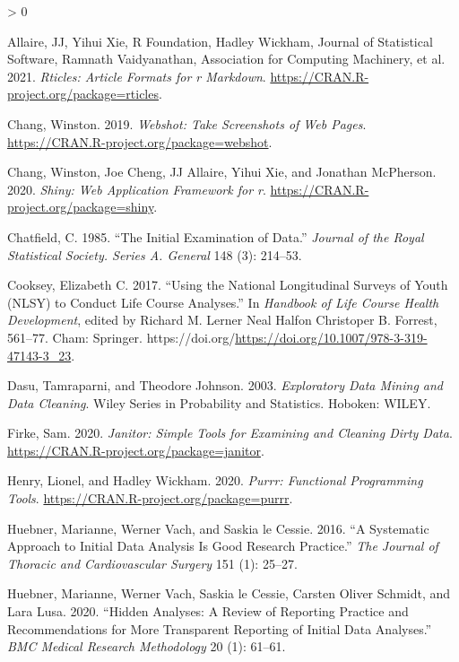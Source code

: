 \documentclass{article}
\newlength{\cslhangindent}
\newenvironment{CSLReferences}[2] %
 {%
  \setlength{\parindent}{0pt}
  \ifodd #1 \everypar{\setlength{\hangindent}{\cslhangindent}}\ignorespaces\fi
  \ifnum #2 > 0
  \setlength{\parskip}{#2\baselineskip}
  \fi
 }%
 {}
\begin{document}
\hypertarget{refs}{}
\begin{CSLReferences}{1}{0}
\leavevmode\hypertarget{ref-rticles}{}%
Allaire, JJ, Yihui Xie, R Foundation, Hadley Wickham, Journal of Statistical Software, Ramnath Vaidyanathan, Association for Computing Machinery, et al. 2021. \emph{Rticles: Article Formats for r Markdown}. \url{https://CRAN.R-project.org/package=rticles}.

\leavevmode\hypertarget{ref-webshot}{}%
Chang, Winston. 2019. \emph{Webshot: Take Screenshots of Web Pages}. \url{https://CRAN.R-project.org/package=webshot}.

\leavevmode\hypertarget{ref-shiny}{}%
Chang, Winston, Joe Cheng, JJ Allaire, Yihui Xie, and Jonathan McPherson. 2020. \emph{Shiny: Web Application Framework for r}. \url{https://CRAN.R-project.org/package=shiny}.

\leavevmode\hypertarget{ref-Chatfield1985TIEo}{}%
Chatfield, C. 1985. {``The Initial Examination of Data.''} \emph{Journal of the Royal Statistical Society. Series A. General} 148 (3): 214--53.

\leavevmode\hypertarget{ref-eliznlsy}{}%
Cooksey, Elizabeth C. 2017. {``Using the National Longitudinal Surveys of Youth (NLSY) to Conduct Life Course Analyses.''} In \emph{Handbook of Life Course Health Development}, edited by Richard M. Lerner Neal Halfon Christoper B. Forrest, 561--77. Cham: Springer. https://doi.org/\url{https://doi.org/10.1007/978-3-319-47143-3_23}.

\leavevmode\hypertarget{ref-DasuTamraparni2003Edma}{}%
Dasu, Tamraparni, and Theodore Johnson. 2003. \emph{Exploratory Data Mining and Data Cleaning}. Wiley Series in Probability and Statistics. Hoboken: WILEY.

\leavevmode\hypertarget{ref-janitor}{}%
Firke, Sam. 2020. \emph{Janitor: Simple Tools for Examining and Cleaning Dirty Data}. \url{https://CRAN.R-project.org/package=janitor}.

\leavevmode\hypertarget{ref-purrr}{}%
Henry, Lionel, and Hadley Wickham. 2020. \emph{Purrr: Functional Programming Tools}. \url{https://CRAN.R-project.org/package=purrr}.

\leavevmode\hypertarget{ref-HuebnerMariannePhD2016Asat}{}%
Huebner, Marianne, Werner Vach, and Saskia le Cessie. 2016. {``A Systematic Approach to Initial Data Analysis Is Good Research Practice.''} \emph{The Journal of Thoracic and Cardiovascular Surgery} 151 (1): 25--27.

\leavevmode\hypertarget{ref-HuebnerMarianne2020Haar}{}%
Huebner, Marianne, Werner Vach, Saskia le Cessie, Carsten Oliver Schmidt, and Lara Lusa. 2020. {``Hidden Analyses: A Review of Reporting Practice and Recommendations for More Transparent Reporting of Initial Data Analyses.''} \emph{BMC Medical Research Methodology} 20 (1): 61--61.


\end{CSLReferences}
\end{document}

